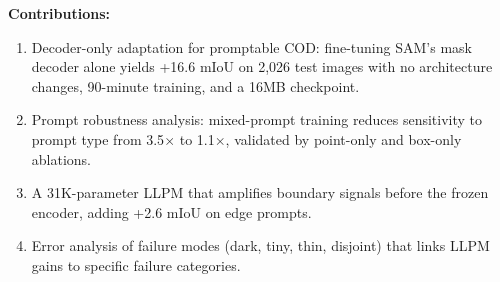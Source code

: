 \noindent\textbf{Contributions:}
\begin{enumerate}
    \item Decoder-only adaptation for promptable COD: fine-tuning SAM's mask decoder alone yields +16.6 mIoU on 2,026 test images with no architecture changes, 90-minute training, and a 16MB checkpoint.
    \item Prompt robustness analysis: mixed-prompt training reduces sensitivity to prompt type from 3.5$\times$ to 1.1$\times$, validated by point-only and box-only ablations.
    \item A 31K-parameter LLPM that amplifies boundary signals before the frozen encoder, adding +2.6 mIoU on edge prompts.
    \item Error analysis of failure modes (dark, tiny, thin, disjoint) that links LLPM gains to specific failure categories.
\end{enumerate}
